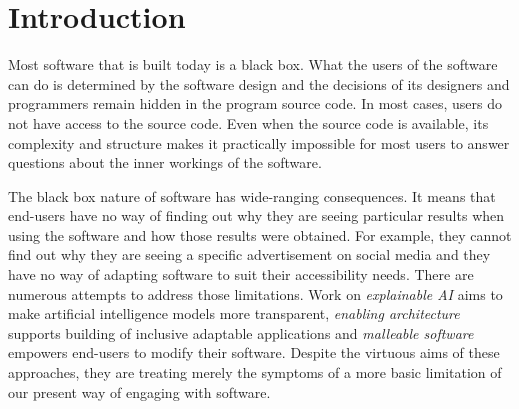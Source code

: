 \section{Introduction}

%
%
Most software that is built today is a black box. What the users of the software can do is
determined by the software design and the decisions of its designers and programmers remain hidden in
the program source code. In most cases, users do not have access to the source code.
Even when the source code is available, its complexity
and structure makes it practically impossible for most users to answer questions about the inner
workings of the software.

The black box nature of software has wide-ranging consequences. It means that end-users have no
way of finding out why they are seeing particular results when using the software and how those results
were obtained. For example, they cannot find out why they are seeing a specific advertisement on
social media and they have no way of adapting software to suit their accessibility needs.
There are numerous attempts to address those limitations. Work on \emph{explainable AI} aims to make artificial intelligence models more
transparent, \emph{enabling architecture} supports building of inclusive
adaptable applications and \emph{malleable software}
empowers end-users to modify their software. Despite the virtuous aims of these
approaches, they are treating merely the symptoms of a more basic
limitation of our present way of engaging with software.

